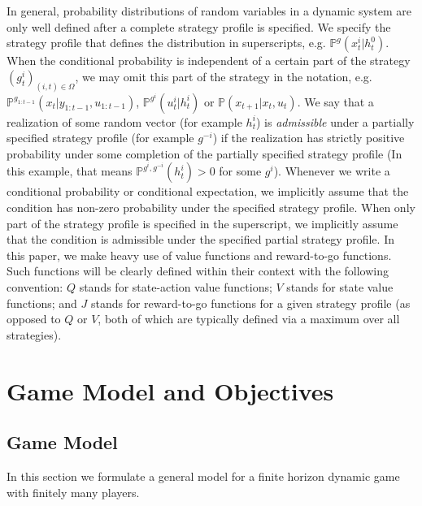 \documentclass[pdflatex,sn-basic]{sn-jnl}
\renewcommand{\Pr}{\mathbb{P}}
\theoremstyle{thmstyleone}%
\theoremstyle{thmstyletwo}%
\theoremstyle{thmstylethree}%
\begin{document}
In general, probability distributions of random variables in a dynamic system are only well defined after a complete strategy profile is specified. We specify the strategy profile that defines the distribution in superscripts, e.g. $\Pr^g(x_t^i|h_t^0)$. When the conditional probability is independent of a certain part of the strategy $(g_t^i)_{(i, t)\in \varOmega}$, we may omit this part of the strategy in the notation, e.g. $\Pr^{g_{1:t-1}}(x_{t}|y_{1:t-1}, u_{1:t-1})$, $\Pr^{g^{i}}(u_{t}^i|h_t^i)$ or $\Pr(x_{t+1}|x_{t}, u_{t})$. We say that a realization of some random vector (for example $h_t^i$) is \emph{admissible} under a partially specified strategy profile (for example $g^{-i}$) if the realization has strictly positive probability under some completion of the partially specified strategy profile (In this example, that means $\Pr^{g^i, g^{-i}}(h_t^i) > 0$ for some $g^i$). Whenever we write a conditional probability or conditional expectation, we implicitly assume that the condition has non-zero probability under the specified strategy profile. When only part of the strategy profile is specified in the superscript, we implicitly assume that the condition is admissible under the specified partial strategy profile. In this paper, we make heavy use of value functions and reward-to-go functions. Such functions will be clearly defined within their context with the following convention: $Q$ stands for state-action value functions; $V$ stands for state value functions; and $J$ stands for reward-to-go functions for a given strategy profile (as opposed to $Q$ or $V$, 
{both of which are typically defined via} a maximum over all strategies).

\section{Game Model and Objectives}\label{sec:suffinfo:gamemodel}
\subsection{Game Model}
In this section we formulate a general model for a finite horizon dynamic game with finitely many players. 
\end{document}
